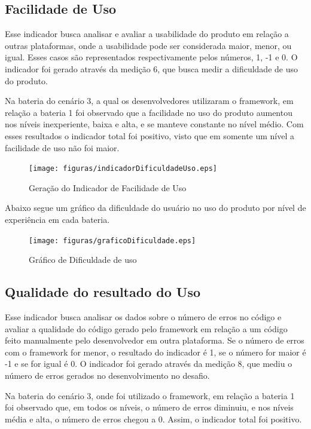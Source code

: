 \subsection{Facilidade de Uso}

Esse indicador busca analisar e avaliar a usabilidade do produto em relação a outras plataformas, onde a usabilidade pode
ser considerada maior, menor, ou igual. Esses casos são representados respectivamente pelos números, 1, -1 e 0. O
indicador foi gerado através da medição 6, que busca medir a dificuldade de uso do produto.

Na bateria do cenário 3, a qual os desenvolvedores utilizaram o framework, em relação a bateria 1 foi observado que a
facilidade no uso do produto aumentou nos níveis inexperiente, baixa e alta, e se manteve constante no nível médio.
Com esses resultados o indicador total foi positivo, visto que em somente um nível a facilidade de uso não foi maior.

\begin{figure}[H]
  \centering
  \label{fig:indicador3}
  \texttt{[image: figuras/indicadorDificuldadeUso.eps]}
  \caption{Geração do Indicador de Facilidade de Uso}
\end{figure}

Abaixo segue um gráfico da dificuldade do usuário no uso do produto por nível de experiência em cada bateria.

\begin{figure}[H]
  \centering
  \label{fig:graficoIndicador3}
  \texttt{[image: figuras/graficoDificuldade.eps]}
  \caption{Gráfico de Dificuldade de uso}
\end{figure}

\subsection{Qualidade do resultado do Uso}

Esse indicador busca analisar os dados sobre o número de erros no código e avaliar a qualidade do código gerado pelo
framework em relação a um código feito manualmente pelo desenvolvedor em outra plataforma. Se o número de erros com o
framework for menor, o resultado do indicador é 1, se o número for maior é -1 e se for igual é 0. O indicador foi gerado
através da medição 8, que mediu o número de erros gerados no desenvolvimento no desafio.

Na bateria do cenário 3, onde foi utilizado o framework, em relação a bateria 1 foi observado que, em todos os níveis,
o número de erros diminuiu, e nos níveis média e alta, o número de erros chegou a 0. Assim, o indicador total foi
positivo.

